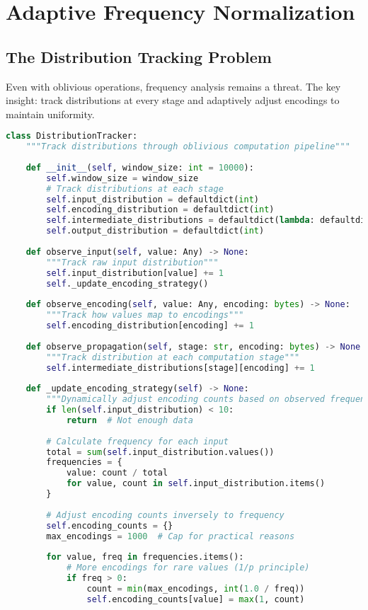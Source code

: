 \section{Adaptive Frequency Normalization}
\label{sec:adaptive-frequency}

\subsection{The Distribution Tracking Problem}

Even with oblivious operations, frequency analysis remains a threat. The key insight: track distributions at every stage and adaptively adjust encodings to maintain uniformity.

\begin{lstlisting}[language=Python, caption={Distribution tracking through computation}]
class DistributionTracker:
    """Track distributions through oblivious computation pipeline"""
    
    def __init__(self, window_size: int = 10000):
        self.window_size = window_size
        # Track distributions at each stage
        self.input_distribution = defaultdict(int)
        self.encoding_distribution = defaultdict(int)
        self.intermediate_distributions = defaultdict(lambda: defaultdict(int))
        self.output_distribution = defaultdict(int)
        
    def observe_input(self, value: Any) -> None:
        """Track raw input distribution"""
        self.input_distribution[value] += 1
        self._update_encoding_strategy()
    
    def observe_encoding(self, value: Any, encoding: bytes) -> None:
        """Track how values map to encodings"""
        self.encoding_distribution[encoding] += 1
        
    def observe_propagation(self, stage: str, encoding: bytes) -> None:
        """Track distribution at each computation stage"""
        self.intermediate_distributions[stage][encoding] += 1
        
    def _update_encoding_strategy(self) -> None:
        """Dynamically adjust encoding counts based on observed frequencies"""
        if len(self.input_distribution) < 10:
            return  # Not enough data
            
        # Calculate frequency for each input
        total = sum(self.input_distribution.values())
        frequencies = {
            value: count / total 
            for value, count in self.input_distribution.items()
        }
        
        # Adjust encoding counts inversely to frequency
        self.encoding_counts = {}
        max_encodings = 1000  # Cap for practical reasons
        
        for value, freq in frequencies.items():
            # More encodings for rare values (1/p principle)
            if freq > 0:
                count = min(max_encodings, int(1.0 / freq))
                self.encoding_counts[value] = max(1, count)
\end{lstlisting}

